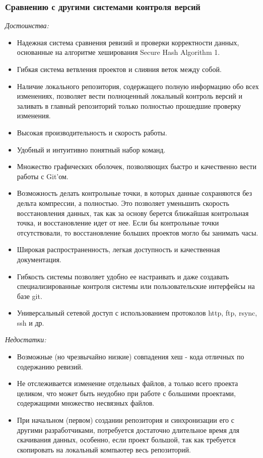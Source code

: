 \documentclass{article}
\begin{document}
		\subsubsection{Сравнению с другими системами контроля версий}
		 	\textit{Достоинства:}
				\begin{itemize}
\item Надежная система сравнения ревизий и проверки корректности данных, основанные на алгоритме хеширования Secure Hash Algorithm 1.
\item Гибкая система ветвления проектов и слияния веток между собой.
\item Наличие локального репозитория, содержащего полную информацию обо всех изменениях, позволяет вести полноценный локальный контроль версий и заливать в главный репозиторий только полностью прошедшие проверку изменения.
\item Высокая производительность и скорость работы.
\item Удобный и интуитивно понятный набор команд.
\item Множество графических оболочек, позволяющих быстро и качественно вести работы с Git’ом.
\item Возможность делать контрольные точки, в которых данные сохраняются без дельта компрессии, а полностью. Это позволяет уменьшить скорость восстановления данных, так как за основу берется ближайшая контрольная точка, и восстановление идет от нее. Если бы контрольные точки отсутствовали, то восстановление больших проектов могло бы занимать часы.
\item Широкая распространенность, легкая доступность и качественная документация.
\item Гибкость системы позволяет удобно ее настраивать и даже создавать специализированные контроля системы или пользовательские интерфейсы на базе git.
\item Универсальный сетевой доступ с использованием протоколов http, ftp, rsync, ssh и др.\\
				\end{itemize}
			\textit{Недостатки:}
				\begin{itemize}
\item Возможные (но чрезвычайно низкие) совпадения хеш - кода отличных по содержанию ревизий.
\item Не отслеживается изменение отдельных файлов, а только всего проекта целиком, что может быть неудобно при работе с большими проектами, содержащими множество несвязных файлов.
\item При начальном (первом) создании репозитория и синхронизации его с другими разработчиками, потребуется достаточно длительное время для скачивания данных, особенно, если проект большой, так как требуется скопировать на локальный компьютер весь репозиторий. 
				\end{itemize}
\end{document}
